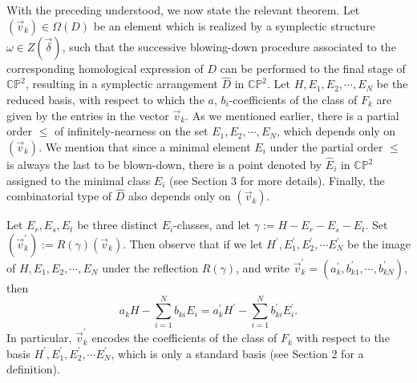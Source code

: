 \documentclass[11pt]{amsart}
\theoremstyle{plain}
\numberwithin{theorem}{section}
\theoremstyle{definition}
\newcommand{\C}{{\mathbb C}}
\renewcommand{\P}{{\mathbb P}}
\begin{document}
With the preceding understood, we now state the relevant theorem. Let $(\vec{v}_k)\in\Omega(D)$ be an element which is realized by a symplectic structure $\omega\in Z(\vec{\delta})$, such that the successive blowing-down procedure associated to the corresponding homological expression of $D$ can be performed to the final stage 
of $\C\P^2$, resulting in a symplectic arrangement $\hat{D}$ in $\C\P^2$. Let $H,E_1,E_2,\cdots,E_N$ be the 
reduced basis, with respect to which the $a$, $b_i$-coefficients of the class of $F_k$ are given by the entries 
in the vector $\vec{v}_k$. As we mentioned earlier, there is a partial order $\leq$ of infinitely-nearness on the set 
$E_1,E_2,\cdots,E_N$, which depends only on $(\vec{v}_k)$. We mention that since a minimal element $E_i$
under the partial order $\leq$ is always the last to be blown-down, there is a point denoted by $\hat{E}_i$ in
$\C\P^2$ assigned to the minimal class $E_i$ (see Section 3 for more details). Finally, the combinatorial type of $\hat{D}$ also depends only on $(\vec{v}_k)$. 

Let $E_r, E_s,E_t$ be three distinct $E_i$-classes, and let $\gamma:=H-E_r-E_s-E_t$. Set 
$(\vec{v}_k^\prime):=R(\gamma)(\vec{v}_k)$. Then observe that if we let $H^\prime, E_1^\prime,E_2^\prime,\cdots E_N^\prime$ be the image of $H,E_1,E_2,\cdots,E_N$ under the reflection $R(\gamma)$, and write 
$\vec{v}_k^\prime=(a_k^\prime, b_{k1}^\prime,\cdots,b_{kN}^\prime)$, then 
$$
a_kH-\sum_{i=1}^N b_{ki} E_i=a_k^\prime H^\prime-\sum_{i=1}^N b_{ki}^\prime E_i^\prime.
$$
In particular, $\vec{v}_k^\prime$ encodes the coefficients of the class of $F_k$ with respect to the basis $H^\prime, E_1^\prime,E_2^\prime,\cdots E_N^\prime$, which is only a standard basis (see Section 2 for a definition).
\end{document}
